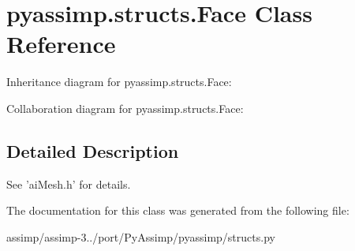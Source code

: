 \hypertarget{classpyassimp_1_1structs_1_1_face}{\section{pyassimp.\+structs.\+Face Class Reference}
\label{classpyassimp_1_1structs_1_1_face}
}


Inheritance diagram for pyassimp.\+structs.\+Face\+:


Collaboration diagram for pyassimp.\+structs.\+Face\+:


\subsection{Detailed Description}
\begin{DoxyVerb}See 'aiMesh.h' for details.
\end{DoxyVerb}
 

The documentation for this class was generated from the following file\+:\begin{DoxyCompactItemize}
\item 
assimp/assimp-\/3../port/\+Py\+Assimp/pyassimp/structs.\+py\end{DoxyCompactItemize}

